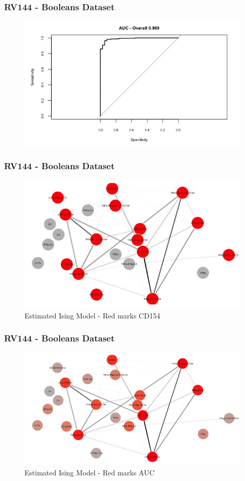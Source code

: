 \documentclass{beamer}
\theoremstyle{definition}
\begin{document}

\begin{frame}
\frametitle{RV144 - Booleans Dataset}
\begin{figure}[]
\includegraphics[width=12 cm]{figures/booleansAUCaggregate}
\end{figure}
\end{frame}


\begin{frame}
\frametitle{RV144 - Booleans Dataset}
\begin{figure}[]
\includegraphics[width=10 cm]{figures/booleansNetworkCD154} 
\caption{Estimated Ising Model - Red marks CD154}
\end{figure}
\end{frame}


\begin{frame}
\frametitle{RV144 - Booleans Dataset}
\begin{figure}[]
\includegraphics[width= 10.5 cm]{figures/booleansNetworkAUC} 
\caption{Estimated Ising Model - Red marks AUC}
\end{figure}
\end{frame}
\end{document}
